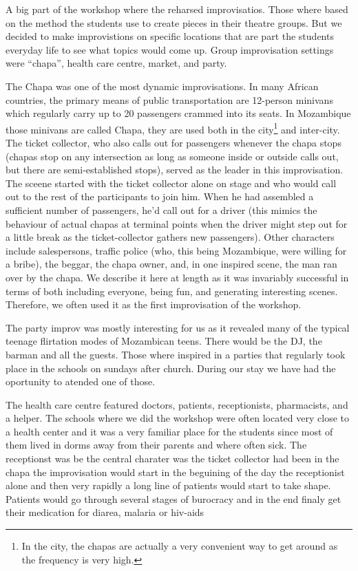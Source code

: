 \documentclass[article,twocolumn,twoside]{memoir}
\begin{document}
A big part of the workshop where the reharsed improvisatios. Those where based
on the method the students use to create pieces in their theatre groups. But we
decided to make improvistions on specific locations that are part the students
everyday life to see what topics would come up. Group improvisation settings
were ``chapa'', health care centre, market, and party.

The Chapa was one of the most dynamic improvisations. In many African
countries, the primary means of public transportation are 12-person minivans
which regularly carry up to 20 passengers crammed into its seats. In
Mozambique those minivans are called Chapa, they are used both in the
city\footnote{In the city, the chapas are actually a very convenient way to get
around as the frequency is very high.} and inter-city. The ticket collector,
who also calls out for passengers whenever the chapa stops (chapas stop on any
intersection as long as someone inside or outside calls out, but there are
semi-established stops), served as the leader in this improvisation. The
sceene started with the ticket collector alone on stage and who would call out
to the rest of the participants to join him. When he had assembled a sufficient
number of passengers, he'd call out for a driver (this mimics the behaviour of
actual chapas at terminal points when the driver might step out for a little
break as the ticket-collector gathers new passengers). Other characters include
salespersons, traffic police (who, this being Mozambique, were willing for a
bribe), the beggar, the chapa owner, and, in one inspired scene, the man ran over
by the chapa. We describe it here at length as it was invariably successful in
terms of both including everyone, being fun, and generating interesting scenes.
Therefore, we often used it as the first improvisation of the workshop.

The party improv was mostly interesting for us as it revealed many of the
typical teenage flirtation modes of Mozambican teens. There would be the DJ,
the barman and all the guests. Those where inspired in a parties that regularly
took place in the schools on sundays after church. During our stay we have had
the oportunity to atended one of those.

The health care centre featured doctors, patients, receptionists, pharmacists,
and a helper. The schools where we did the workshop were often located very
close to a health center and it was a very familiar place for the students
since most of them lived in dorms away from their parents and where often sick.
The receptionst was be the central charater was the ticket collector had been
in the chapa the improvisation would start in the beguining of the day the
receptionist alone and then very rapidly a long line of patients would start to
take shape. Patients would go through several stages of burocracy and in the
end finaly get their medication for diarea, malaria or hiv-aids
\end{document}

